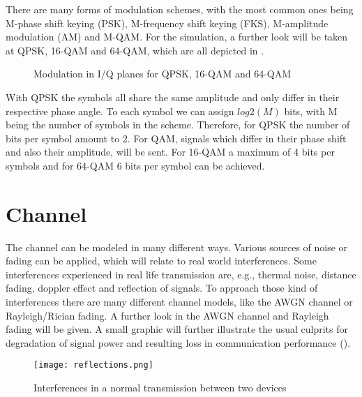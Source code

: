 There are many forms of modulation schemes, with the most common ones being M-phase shift keying (PSK), M-frequency shift keying (FKS), M-amplitude modulation (AM) and M-\gls{QAM}. For the simulation, a further look will be taken at \gls{QPSK}, 16-\gls{QAM} and 64-\gls{QAM}, which are all depicted in .

\begin{figure}[!htb]
	\setlength{}
	\setlength\fheight{0.3\textheight}
\begin{subfigure}
	
		
\end{subfigure}
\begin{subfigure}
	
	
\end{subfigure}
\begin{subfigure}

	
\end{subfigure}	
	\caption{Modulation in I/Q planes for QPSK, 16-QAM and 64-QAM}
	\label{fig:Modulation}
\end{figure}

With \gls{QPSK} the symbols all share the same amplitude and only differ in their respective phase angle. To each symbol we can assign $log2(M)$ bits, with M being the number of symbols in the scheme. Therefore, for \gls{QPSK} the number of bits per symbol amount to 2.
\newline
For \gls{QAM}, signals which differ in their phase shift and also their amplitude, will be sent. For 16-\gls{QAM} a maximum of 4 bits per symbols and for 64-\gls{QAM} 6 bits per symbol can be achieved. 

\clearpage

\section{Channel}
\label{sec:channel} 
The channel can be modeled in many different ways. Various sources of noise or fading can be applied, which will relate to real world interferences. Some interferences experienced in real life transmission are, e.g., thermal noise, distance fading, doppler effect and reflection of signals. To approach those kind of interferences there are many different channel models, like the \gls{AWGN} channel or Rayleigh/Rician fading. A further look in the \gls{AWGN} channel and Rayleigh fading will be given. A small graphic will further illustrate the usual culprits for degradation of signal power and resulting loss in communication performance ().
\begin{figure}[!htb]
	\centering
	\texttt{[image: reflections.png]}
	\caption{Interferences in a normal transmission between two devices}
	\label{fig:interferences}
\end{figure}
\newpage
